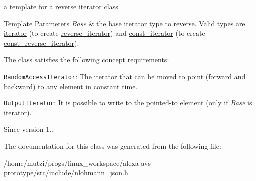 a template for a reverse iterator class 


\begin{DoxyTemplParams}{Template Parameters}
{\em Base} & the base iterator type to reverse. Valid types are \hyperlink{classnlohmann_1_1basic__json_a099316232c76c034030a38faa6e34dca}{iterator} (to create \hyperlink{classnlohmann_1_1basic__json_ac223d5560c2b05a208c88de67376c5f2}{reverse\+\_\+iterator}) and \hyperlink{classnlohmann_1_1basic__json_a41a70cf9993951836d129bb1c2b3126a}{const\+\_\+iterator} (to create \hyperlink{classnlohmann_1_1basic__json_a72be3c24bfa24f0993d6c11af03e7404}{const\+\_\+reverse\+\_\+iterator}).\\
\hline
\end{DoxyTemplParams}
The class satisfies the following concept requirements\+:
\begin{DoxyItemize}
\item \href{http://en.cppreference.com/w/cpp/concept/RandomAccessIterator}{\tt Random\+Access\+Iterator}\+: The iterator that can be moved to point (forward and backward) to any element in constant time.
\item \href{http://en.cppreference.com/w/cpp/concept/OutputIterator}{\tt Output\+Iterator}\+: It is possible to write to the pointed-\/to element (only if {\itshape Base} is \hyperlink{classnlohmann_1_1basic__json_a099316232c76c034030a38faa6e34dca}{iterator}).
\end{DoxyItemize}

\begin{DoxySince}{Since}
version 1.. 
\end{DoxySince}


The documentation for this class was generated from the following file\+:\begin{DoxyCompactItemize}
\item 
/home/mutzi/progs/linux\+\_\+workspace/alexa-\/avs-\/prototype/src/include/nlohmann\+\_\+json.\+h\end{DoxyCompactItemize}
